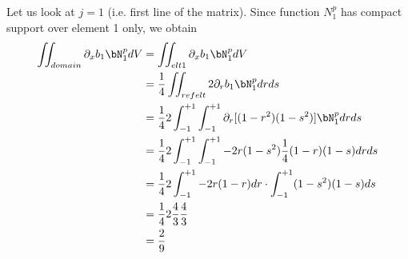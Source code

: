 Let us look at $j=1$ (i.e. first line of the matrix). Since function $N_1^p$ has compact support 
over element 1 only, we obtain
\begin{align}
\iint_{domain} \partial_x b_1 \bN_1^p dV
&= \iint_{elt 1} \partial_x b_1 \bN_1^p dV \\
&= \frac14 \iint_{ref elt} 2\partial_r b_1 \bN_1^p drds \\
&= \frac14 2\int_{-1}^{+1} \int_{-1}^{+1}  \partial_r [(1-r^2)(1-s^2)] \bN_1^p    dr ds \\
&= \frac14 2\int_{-1}^{+1}   \int_{-1}^{+1}  -2r (1-s^2) \frac14(1-r)(1-s)   dr ds \\
&= \frac14 2\int_{-1}^{+1} -2r(1-r) dr \cdot  \int_{-1}^{+1}  (1-s^2) (1-s) ds \\
&= \frac14 2 \frac43  \frac43  \\
&= \frac29
\end{align}


